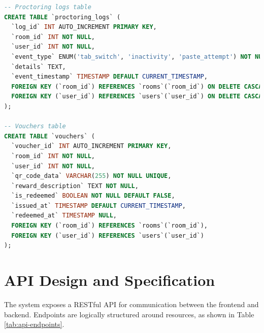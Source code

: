 \begin{lstlisting}[language=SQL, caption={SQL Schema for the `proctoring_logs` and `vouchers` tables}]
-- Proctoring logs table
CREATE TABLE `proctoring_logs` (
  `log_id` INT AUTO_INCREMENT PRIMARY KEY,
  `room_id` INT NOT NULL,
  `user_id` INT NOT NULL,
  `event_type` ENUM('tab_switch', 'inactivity', 'paste_attempt') NOT NULL,
  `details` TEXT,
  `event_timestamp` TIMESTAMP DEFAULT CURRENT_TIMESTAMP,
  FOREIGN KEY (`room_id`) REFERENCES `rooms`(`room_id`) ON DELETE CASCADE,
  FOREIGN KEY (`user_id`) REFERENCES `users`(`user_id`) ON DELETE CASCADE
);

-- Vouchers table
CREATE TABLE `vouchers` (
  `voucher_id` INT AUTO_INCREMENT PRIMARY KEY,
  `room_id` INT NOT NULL,
  `user_id` INT NOT NULL,
  `qr_code_data` VARCHAR(255) NOT NULL UNIQUE,
  `reward_description` TEXT NOT NULL,
  `is_redeemed` BOOLEAN NOT NULL DEFAULT FALSE,
  `issued_at` TIMESTAMP DEFAULT CURRENT_TIMESTAMP,
  `redeemed_at` TIMESTAMP NULL,
  FOREIGN KEY (`room_id`) REFERENCES `rooms`(`room_id`),
  FOREIGN KEY (`user_id`) REFERENCES `users`(`user_id`)
);
\end{lstlisting}

\section{API Design and Specification}
\label{sec:arch-api}
The system exposes a RESTful API for communication between the frontend and backend. Endpoints are logically structured around resources, as shown in Table \ref{tab:api-endpoints}.

